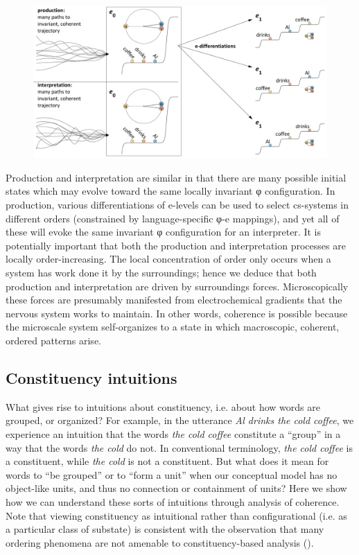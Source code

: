   
\begin{figure}
\includegraphics[width=\textwidth]{figures/Tilsen-img135.png}
\caption{\missingcaption}
\label{fig:6:16}
\end{figure}
 

  Production and interpretation are similar in that there are many possible initial states which may evolve toward the same locally invariant φ configuration. In production, various differentiations of e-levels can be used to select cs-systems in different orders (constrained by language-specific φ-e mappings), and yet all of these will evoke the same invariant φ configuration for an interpreter. It is potentially important that both the production and interpretation processes are locally order-increasing. The local concentration of order only occurs when a system has work done it by the surroundings; hence we deduce that both production and interpretation are driven by surroundings forces. Microscopically these forces are presumably manifested from electrochemical gradients that the nervous system works to maintain. In other words, coherence is possible because the microscale system self-organizes to a state in which macroscopic, coherent, ordered patterns arise.

\subsection{Constituency intuitions}

What gives rise to intuitions about constituency, i.e. about how words are grouped, or organized? For example, in the utterance \textit{Al drinks the cold coffee}, we experience an intuition that the words \textit{the cold coffee} constitute a “group” in a way that the words \textit{the cold} do not. In conventional terminology, \textit{the cold coffee} is a constituent, while \textit{the cold} is not a constituent. But what does it mean for words to “be grouped” or to “form a unit” when our conceptual model has no object-like units, and thus no connection or containment of units? Here we show how we can understand these sorts of intuitions through analysis of coherence. Note that viewing constituency as intuitional rather than configurational (i.e. as a particular class of substate) is consistent with the observation that many ordering phenomena are not amenable to constituency-based analysis (\citealt{Langacker1997,Phillips2003}).

